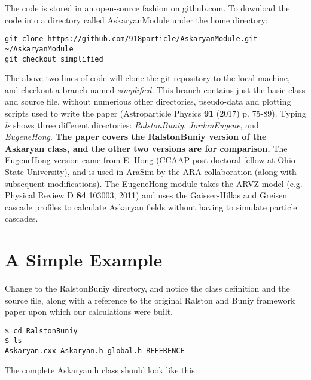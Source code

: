 \documentclass[10pt]{article}
\begin{document}
The code is stored in an open-source fashion on github.com.  To download the code into a directory called AskaryanModule under the home directory:

\begin{verbatim}
git clone https://github.com/918particle/AskaryanModule.git ~/AskaryanModule
git checkout simplified
\end{verbatim}

The above two lines of code will clone the git repository to the local machine, and checkout a branch named \textit{simplified.}  This branch contains just the basic class and source file, without numerious other directories, pseudo-data and plotting scripts used to write the paper (Astroparticle Physics \textbf{91} (2017) p. 75-89).  Typing \textit{ls} shows three different directories: \textit{RalstonBuniy}, \textit{JordanEugene}, and \textit{EugeneHong}.  \textbf{The paper covers the RalstonBuniy version of the Askaryan class, and the other two versions are for comparison.}  The EugeneHong version came from E. Hong (CCAAP post-doctoral fellow at Ohio State University), and is used in AraSim by the ARA collaboration (along with subsequent modifications).  The EugeneHong module takes the ARVZ model (e.g. Physical Review D \textbf{84} 103003, 2011) and uses the Gaisser-Hillas and Greisen cascade profiles to calculate Askaryan fields without having to simulate particle cascades.

\section{A Simple Example}

Change to the RalstonBuniy directory, and notice the class definition and the source file, along with a reference to the original Ralston and Buniy framework paper upon which our calculations were built.

\begin{verbatim}
$ cd RalstonBuniy
$ ls
Askaryan.cxx Askaryan.h global.h REFERENCE
\end{verbatim}

The complete Askaryan.h class should look like this:
\end{document}

